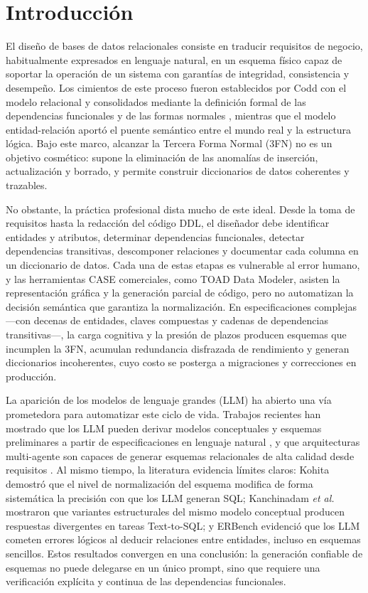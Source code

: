 \documentclass[conference]{IEEEtran}
\begin{document}
\section{Introducción}
El diseño de bases de datos relacionales consiste en traducir requisitos de negocio, habitualmente expresados en lenguaje natural, en un esquema físico capaz de soportar la operación de un sistema con garantías de integridad, consistencia y desempeño. Los cimientos de este proceso fueron establecidos por Codd con el modelo relacional \cite{codd1970} y consolidados mediante la definición formal de las dependencias funcionales y de las formas normales \cite{codd1971}, mientras que el modelo entidad-relación \cite{chen1976} aportó el puente semántico entre el mundo real y la estructura lógica. Bajo este marco, alcanzar la Tercera Forma Normal (3FN) no es un objetivo cosmético: supone la eliminación de las anomalías de inserción, actualización y borrado, y permite construir diccionarios de datos coherentes y trazables.

No obstante, la práctica profesional dista mucho de este ideal. Desde la toma de requisitos hasta la redacción del código DDL, el diseñador debe identificar entidades y atributos, determinar dependencias funcionales, detectar dependencias transitivas, descomponer relaciones y documentar cada columna en un diccionario de datos. Cada una de estas etapas es vulnerable al error humano, y las herramientas CASE comerciales, como TOAD Data Modeler, asisten la representación gráfica y la generación parcial de código, pero no automatizan la decisión semántica que garantiza la normalización. En especificaciones complejas ---con decenas de entidades, claves compuestas y cadenas de dependencias transitivas---, la carga cognitiva y la presión de plazos producen esquemas que incumplen la 3FN, acumulan redundancia disfrazada de rendimiento y generan diccionarios incoherentes, cuyo costo se posterga a migraciones y correcciones en producción.

La aparición de los modelos de lenguaje grandes (LLM) ha abierto una vía prometedora para automatizar este ciclo de vida. Trabajos recientes han mostrado que los LLM pueden derivar modelos conceptuales y esquemas preliminares a partir de especificaciones en lenguaje natural \cite{dicaro2026}, y que arquitecturas multi-agente son capaces de generar esquemas relacionales de alta calidad desde requisitos \cite{wang2025schemaagent}. Al mismo tiempo, la literatura evidencia límites claros: Kohita \cite{kohita2025} demostró que el nivel de normalización del esquema modifica de forma sistemática la precisión con que los LLM generan SQL; Kanchinadam \textit{et al.} \cite{kanchinadam2026} mostraron que variantes estructurales del mismo modelo conceptual producen respuestas divergentes en tareas Text-to-SQL; y ERBench \cite{oh2024erbench} evidenció que los LLM cometen errores lógicos al deducir relaciones entre entidades, incluso en esquemas sencillos. Estos resultados convergen en una conclusión: la generación confiable de esquemas no puede delegarse en un único prompt, sino que requiere una verificación explícita y continua de las dependencias funcionales.
\end{document}
